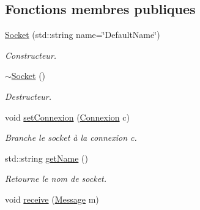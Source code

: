 \subsection*{Fonctions membres publiques}
\begin{DoxyCompactItemize}
\item 
\hypertarget{classSocket_a04302e4ac7ddb995c766de9078cd848c}{\hyperlink{classSocket_a04302e4ac7ddb995c766de9078cd848c}{Socket} (std\-::string name=\char`\"{}Default\-Name\char`\"{})}\label{classSocket_a04302e4ac7ddb995c766de9078cd848c}

\begin{DoxyCompactList}\small\item\em Constructeur. \end{DoxyCompactList}\item 
\hypertarget{classSocket_aeac4eb6379a543d38ed88977d3b6630a}{\hyperlink{classSocket_aeac4eb6379a543d38ed88977d3b6630a}{$\sim$\-Socket} ()}\label{classSocket_aeac4eb6379a543d38ed88977d3b6630a}

\begin{DoxyCompactList}\small\item\em Destructeur. \end{DoxyCompactList}\item 
\hypertarget{classSocket_af59c7f08d2a170ec9b15bce6fd62f865}{void \hyperlink{classSocket_af59c7f08d2a170ec9b15bce6fd62f865}{set\-Connexion} (\hyperlink{classConnexion}{Connexion} c)}\label{classSocket_af59c7f08d2a170ec9b15bce6fd62f865}

\begin{DoxyCompactList}\small\item\em Branche le socket à la connexion c. \end{DoxyCompactList}\item 
\hypertarget{classSocket_aaefa10006cbf7a7a082e4adc606b3cea}{std\-::string \hyperlink{classSocket_aaefa10006cbf7a7a082e4adc606b3cea}{get\-Name} ()}\label{classSocket_aaefa10006cbf7a7a082e4adc606b3cea}

\begin{DoxyCompactList}\small\item\em Retourne le nom de socket. \end{DoxyCompactList}\item 
\hypertarget{classSocket_af137eda5415e1bd9aa6dd6467eb0d97d}{void \hyperlink{classSocket_af137eda5415e1bd9aa6dd6467eb0d97d}{receive} (\hyperlink{classMessage}{Message} m)}\label{classSocket_af137eda5415e1bd9aa6dd6467eb0d97d}


\end{DoxyCompactItemize}
